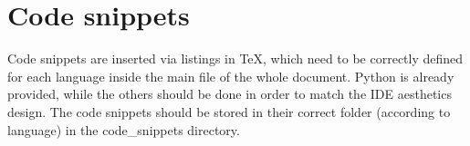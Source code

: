 \newpage
\section{Code snippets}
\label{sec:code}

Code snippets are inserted via listings in \TeX, which need to be correctly defined for each language inside the main file of the whole document. Python is already provided, while the others should be done in order to match the IDE aesthetics design. The code snippets should be stored in their correct folder (according to language) in the code\_snippets directory.

\vspace{1cm}

%